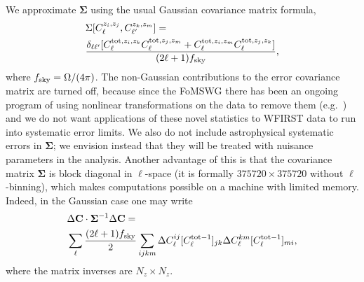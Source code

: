 \documentclass[usenatbib]{mnras}
\begin{document}
We approximate ${\boldsymbol\Sigma}$ using the usual Gaussian
covariance matrix formula,
\begin{align}
&\Sigma[C^{z_i,z_j}_\ell, C^{z_k,z_m}_{\ell'}]= \nonumber\\
& \frac{\delta_{\ell\ell'} [ C^{{\rm tot},z_i,z_k}_\ell C^{{\rm tot},z_j,z_m}_\ell + C^{{\rm tot},z_i,z_m}_\ell C^{{\rm tot},z_j,z_k}_\ell]}{(2\ell+1)f_{\rm sky}} ,
\label{eq:SGauss}
\end{align}
where $f_{\rm sky} = \Omega/(4\pi)$.  The non-Gaussian contributions
to the error covariance matrix are turned off, because since the
FoMSWG \citep{2009arXiv0901.0721A} there has been an ongoing program of
using nonlinear transformations on the data to remove them (e.g.\
\cite{2009ApJ...698L..90N, 2011ApJ...729L..11S}) and
we do not want applications of these novel statistics to WFIRST data
to run into systematic error limits. We also do not include astrophysical systematic errors in ${\boldsymbol\Sigma}$; we envision instead that they will be treated with nuisance parameters in the analysis. Another advantage of this is that the covariance matrix ${\boldsymbol\Sigma}$ is block diagonal in $\ell$-space (it is formally $375720\times375720$ without $\ell$-binning), which makes computations possible on a machine with limited memory. Indeed, in the Gaussian case one may write
\begin{align}
&\Delta{\bf C} \cdot {\boldsymbol\Sigma}^{-1} \Delta {\bf C}=\nonumber\\
& \sum_\ell \frac{(2\ell+1)f_{\rm sky}}2 \sum_{ijkm}
 \Delta C_\ell^{ij} [C^{{\rm tot}-1}_\ell]_{jk}
 \Delta C_\ell^{km} [C^{{\rm tot}-1}_\ell]_{mi},
\label{eq:sprodform}
\end{align}
where the matrix inverses are $N_z\times N_z$.
\end{document}
